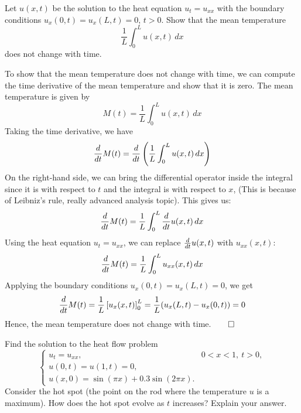 \documentclass[12pt]{article}
\begin{document}
Let $u(x,t)$ be the solution to the heat equation $u_t = u_{xx}$ with the boundary conditions $u_x(0,t) = u_x(L,t) = 0$, $t > 0$. Show that the mean temperature
\[
\frac{1}{L} \int_0^L u(x,t)\, dx
\]
does not change with time.

\sol
To show that the mean temperature does not change with time, we can compute the time derivative of the mean temperature and show that it is zero. The mean temperature is given by
\[
M(t) = \frac{1}{L} \int_0^L u(x,t)\, dx
\]
Taking the time derivative, we have
\[
\frac{d}{dt}M(t) = \frac{d}{dt} \left(  \frac{1}{L} \int_0^L u(x,t)\, dx  \right) 
\]
On the right-hand side, we can bring the differential operator inside the integral since it is with respect to $t$ and the integral is with respect to $x$, (This is because of Leibniz's rule, really advanced analysis topic). This gives us:
\[
\frac{d}{dt}M(t) = \frac{1}{L} \int_0^L \frac{d}{dt} u(x,t)\, dx
\]
Using the heat equation $u_t = u_{xx}$, we can replace $\frac{d}{dt} u(x,t)$ with $u_{xx}(x,t)$:
\[
\frac{d}{dt}M(t) = \frac{1}{L} \int_0^L u_{xx}(x,t)\, dx
\]
Applying the boundary conditions $u_x(0,t) = u_x(L,t) = 0$, we get
\[
\frac{d}{dt}M(t) = \frac{1}{L} \left[ u_x(x,t) \right]_0^L = \frac{1}{L} (u_x(L,t) - u_x(0,t)) = 0
\]
Hence, the mean temperature does not change with time.$\qed$

Find the solution to the heat flow problem
\[
\begin{cases}
u_t = u_{xx}, & 0 < x < 1,\ t > 0, \\
u(0,t) = u(1,t) = 0, \\
u(x,0) = \sin(\pi x) + 0.3\sin(2\pi x).
\end{cases}
\]
Consider the hot spot (the point on the rod where the temperature $u$ is a maximum). How does the hot spot evolve as $t$ increases? Explain your answer.
\end{document}
